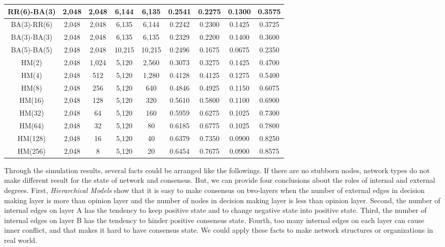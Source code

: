 \begin{table}[!htb]
\begin{center}
\begin{tabular}{c|c|c|c|c|c|c|c|c}
			RR(6)-BA(3)            & 2,048 	& 2,048   & 6,144   & 6,135   &  0.2541   & 0.2275 & 0.1300 & 0.3575   \\ \hline 
			BA(3)-RR(6)            & 2,048 	& 2,048   & 6,135   & 6,144   &  0.2242   & 0.2300 & 0.1425 & 0.3725   \\ \hline
			BA(3)-BA(3)            & 2,048 	& 2,048   & 6,135   & 6,135   &  0.2329   & 0.2200 & 0.1400 & 0.3600   \\ \hline
			BA(5)-BA(5)            & 2,048 	& 2,048   & 10,215  & 10,215  &  0.2496   & 0.1675 & 0.0675 & 0.2350   \\ \hline
			HM(2)  				   & 2,048 	& 1,024   & 5,120   & 2,560   &  0.3073   & 0.3275 & 0.1425 & 0.4700   \\ \hline    
			HM(4) 				   & 2,048 	&  512    & 5,120   & 1,280   &  0.4128   & 0.4125 & 0.1275 & 0.5400   \\ \hline
			HM(8)  				   & 2,048 	&  256    & 5,120   & 640     &  0.4846   & 0.4925 & 0.1150 & 0.6075   \\ \hline
			HM(16)				   & 2,048 	&  128    & 5,120   & 320     &  0.5610   & 0.5800 & 0.1100 & 0.6900   \\ \hline
			HM(32) 				   & 2,048 	&   64    & 5,120   & 160     &  0.5959   & 0.6275 & 0.1025 & 0.7300   \\ \hline
			HM(64) 				   & 2,048 	&   32    & 5,120   & 80      &  0.6185   & 0.6775 & 0.1025 & 0.7800   \\ \hline 
			HM(128) 			   & 2,048 	&   16    & 5,120   & 40      &  0.6379   & 0.7350 & 0.0900 & 0.8250   \\ \hline 
			HM(256) 			   & 2,048 	&    8    & 5,120   & 20      &  0.6454   & 0.7675 & 0.0900 & 0.8575   \\ \hline 
			 \hline
		\end{tabular}
	\end{center}
\end{table} 
Through the simulation results, several facts could be arranged like the followings. If there are no stubborn nodes, network types do not make different result for the state of network and consensus. But, we can provide four conclusions about the roles of internal and external degrees. First, \textit{Hierarchical Models} show that it is easy to make consensus on two-layers when the number of external edges in decision making layer is more than opinion layer and the number of nodes in decision making layer is less than opinion layer. Second, the number of internal edges on layer A has the tendency to keep positive state and to change negative state into positive state. Third, the number of internal edges on layer B has the tendency to hinder positive consensus state. Fourth, too many internal edges on each layer can cause inner conflict, and that makes it hard to have consensus state. We could apply these facts to make network structures or organizations in real world. \\